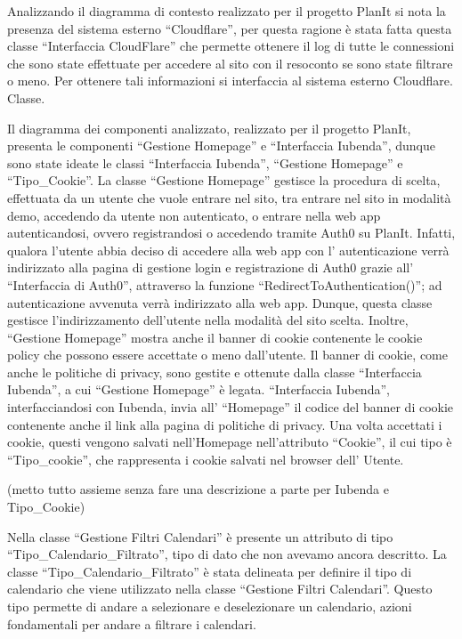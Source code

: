 \begin{listaPersonale}[DCL]{}

    Analizzando il diagramma di contesto realizzato per il progetto PlanIt si nota la presenza del sistema esterno “Cloudflare”, per questa ragione è stata fatta questa classe “Interfaccia CloudFlare” che permette ottenere il log di tutte le connessioni che sono state effettuate per accedere al sito con il resoconto se sono state filtrare o meno. Per ottenere tali informazioni si interfaccia al sistema esterno Cloudflare. Classe.



    Il diagramma dei componenti analizzato, realizzato per il progetto PlanIt, presenta le componenti “Gestione Homepage” e “Interfaccia Iubenda”, dunque sono state ideate le classi “Interfaccia Iubenda”, “Gestione Homepage” e “Tipo\_Cookie”.
    La classe “Gestione Homepage” gestisce la procedura di scelta, effettuata da un utente che vuole entrare nel sito, tra entrare nel sito in modalità demo, accedendo da utente non autenticato, o entrare nella web app autenticandosi, ovvero registrandosi o accedendo tramite Auth0 su PlanIt. Infatti, qualora l'utente abbia deciso di accedere alla web app con l' autenticazione verrà indirizzato alla pagina di gestione login e registrazione di Auth0 grazie all' “Interfaccia di Auth0”, attraverso la funzione “RedirectToAuthentication()”; ad autenticazione avvenuta verrà indirizzato alla web app. Dunque, questa classe gestisce l'indirizzamento dell'utente nella modalità del sito scelta. Inoltre, “Gestione Homepage” mostra anche il banner di cookie contenente le cookie policy che possono essere accettate o meno dall'utente. Il banner di cookie, come anche le politiche di privacy, sono gestite e ottenute dalla classe “Interfaccia Iubenda”, a cui “Gestione Homepage” è legata. “Interfaccia Iubenda”, interfacciandosi con Iubenda, invia all' “Homepage” il codice del banner di cookie contenente anche il link alla pagina di politiche di privacy. Una volta accettati i cookie, questi vengono salvati nell'Homepage nell'attributo “Cookie”, il cui tipo è “Tipo\_cookie”, che rappresenta i cookie salvati nel browser dell' Utente.

    (metto tutto assieme senza fare una descrizione a parte per Iubenda e Tipo\_Cookie)


    Nella classe “Gestione Filtri Calendari” è presente un attributo di tipo “Tipo\_Calendario\_Filtrato”, tipo di dato che non avevamo ancora descritto. La classe “Tipo\_Calendario\_Filtrato” è stata delineata per definire il tipo di calendario che viene utilizzato nella classe “Gestione Filtri Calendari”. Questo tipo permette di andare a selezionare e deselezionare un calendario, azioni fondamentali per andare a filtrare i calendari.




\end{listaPersonale}
